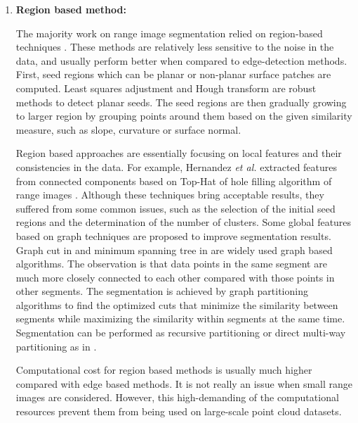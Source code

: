 \begin{enumerate}
\item {\bf Region based method:}

The majority work on range image segmentation relied on 
region-based techniques \cite{MS_XW,MS_RHV,MS_PV}.
These methods are relatively less sensitive to the noise in the data,
and usually perform better when compared to edge-detection methods.
First, seed regions which can be planar or non-planar 
surface patches are computed.
Least squares adjustment and Hough transform are robust methods 
to detect planar seeds.
The seed regions are then gradually growing to larger region 
by grouping points around them based on the given similarity measure, 
such as slope, curvature or surface normal. 

Region based approaches are essentially focusing on local features
and their consistencies in the data.
For example, Hernandez {\it et al.} extracted features from connected components
based on Top-Hat of hole filling algorithm of range images \cite{MS_HMP}.
Although these techniques bring acceptable results, 
they suffered from some common issues, 
such as the selection of the initial seed regions
and the determination of the number of clusters.
Some global features based on graph techniques are proposed to improve
segmentation results.
Graph cut in \cite{MS_SM,MS_BK} and minimum spanning tree in \cite{MS_HK}
are widely used graph based algorithms.
The observation is that data points in the same segment 
are much more closely connected to each other 
compared with those points in other segments. 
The segmentation is achieved by graph partitioning algorithms to
find the optimized cuts that minimize the similarity between segments 
while maximizing the similarity within segments at the same time. 
Segmentation can be performed as recursive partitioning 
or direct multi-way partitioning as in \cite{MS_SZ}.

Computational cost for region based methods is usually much higher
compared with edge based methods. 
It is not really an issue when small range images are considered.
However, this high-demanding of the computational resources prevent 
them from being used on large-scale point cloud datasets.

\end{enumerate}



